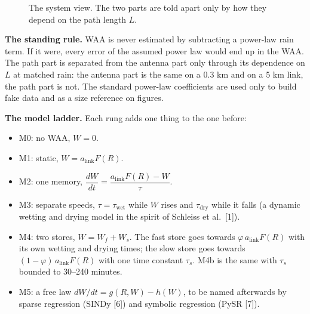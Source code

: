\documentclass[11pt,a4paper]{article}
\begin{document}
\begin{figure}[H]
\centering
{}
\caption{The system view. The two parts are told apart only by how they depend on the path length $L$.}
\label{fig:system}
\end{figure}

\textbf{The standing rule.} WAA is never estimated by subtracting a power-law rain term. If it were, every error of
the assumed power law would end up in the WAA. The path part is separated from the antenna part only through its
dependence on $L$ at matched rain: the antenna part is the same on a 0.3 km and on a 5 km link, the path part is not.
The standard power-law coefficients are used only to build fake data and as a size reference on figures.

\textbf{The model ladder.} Each rung adds one thing to the one before:
\begin{itemize}
\item M0: no WAA, $W = 0$.
\item M1: static, $W = a_{\mathrm{link}}F(R)$.
\item M2: one memory, $\dfrac{dW}{dt} = \dfrac{a_{\mathrm{link}}F(R) - W}{\tau}$.
\item M3: separate speeds, $\tau = \tau_{\mathrm{wet}}$ while $W$ rises and $\tau_{\mathrm{dry}}$ while it falls (a
dynamic wetting and drying model in the spirit of Schleiss et al.\ [1]).
\item M4: two stores, $W = W_f + W_s$. The fast store goes towards $\varphi\,a_{\mathrm{link}}F(R)$ with its own
wetting and drying times; the slow store goes towards $(1-\varphi)\,a_{\mathrm{link}}F(R)$ with one time constant
$\tau_s$. M4b is the same with $\tau_s$ bounded to 30--240 minutes.
\item M5: a free law $dW/dt = g(R,W) - h(W)$, to be named afterwards by sparse regression (SINDy [6]) and symbolic
regression (PySR [7]).
\end{itemize}
\end{document}
